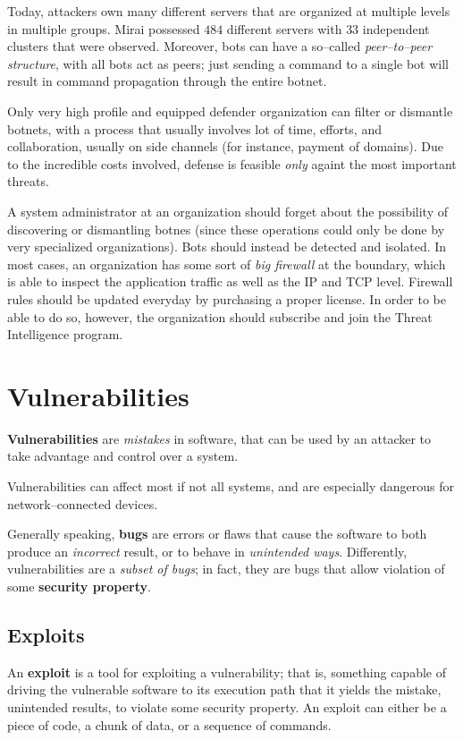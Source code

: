 \documentclass[10pt]{\classname}
\begin{document}
Today, attackers own many different servers that are organized at multiple
levels in multiple groups. Mirai possessed $484$ different servers with $33$
independent clusters that were observed. Moreover, bots can have a so--called
\emph{peer--to--peer structure}, with all bots act as peers; just sending a
command to a single bot will result in command propagation through the entire
botnet.

Only very high profile and equipped defender organization can filter or
dismantle botnets, with a process that usually involves lot of time, efforts,
and collaboration, usually on side channels (for instance, payment of domains).
Due to the incredible costs involved, defense is feasible \emph{only} againt
the most important threats.

A system administrator at an organization should forget about the possibility
of discovering or dismantling botnes (since these operations could only be done
by very specialized organizations). Bots should instead be detected and isolated.
In most cases, an organization has some sort of \emph{big firewall} at the
boundary, which is able to inspect the application traffic as well as the IP
and TCP level. Firewall rules should be updated everyday by purchasing a proper
license. In order to be able to do so, however, the organization should
subscribe and join the Threat Intelligence program.

\section{Vulnerabilities}

\textbf{Vulnerabilities} are \emph{mistakes} in software, that can be used by
an attacker to take advantage and control over a system.

Vulnerabilities can affect most if not all systems, and are especially
dangerous for network--connected devices.

Generally speaking, \textbf{bugs} are errors or flaws that cause the software
to both produce an \emph{incorrect} result, or to behave in \emph{unintended
ways}. Differently, vulnerabilities are a \emph{subset of bugs}; in fact, they
are bugs that allow violation of some \textbf{security property}.

\subsection{Exploits}

An \textbf{exploit} is a tool for exploiting a vulnerability; that is,
something capable of driving the vulnerable software to its execution path that
it yields the mistake, unintended results, to violate some security property.
An exploit can either be a piece of code, a chunk of data, or a sequence of
commands.
\end{document}
